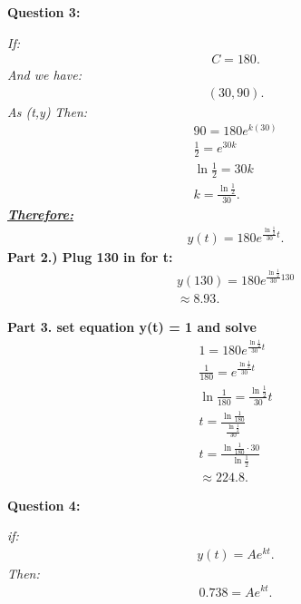 \documentclass{report}
\begin{document}
    \bigbreak \noindent \bigbreak \noindent 
    \begin{Large}
        \textbf{Question 3:}
    \end{Large}
    \bigbreak \noindent 
    \bigbreak \noindent 
    \textit{If:}
    \begin{align*}
        C=180
    .\end{align*}
    \bigbreak \noindent 
    \textit{And we have:}
    \begin{align*}
        (30, 90)
    .\end{align*}
    \bigbreak \noindent 
    \textit{As (t,y)}
    \bigbreak \noindent 
    \textit{Then:}
    \begin{align*}
        90 = 180e^{k(30)} \\ 
        \frac{1}{2} = e^{30k} \\
        \ln{\frac{1}{2}} =30k \\
        k = \frac{\ln{\frac{1}{2}}}{30} 
    .\end{align*}
    \bigbreak \noindent 
    \textbf{\textit{\underline{Therefore:}}}
    \begin{align*}
        y(t) = 180e^{\frac{\ln{\frac{1}{2}}}{30}t}
    .\end{align*}
    \bigbreak \noindent 
    \textbf{Part 2.) Plug 130 in for t:}
    \begin{align*}
        y(130) = 180e^{\frac{\ln{\frac{1}{2}}}{30}130} \\
        \approx 8.93
    .\end{align*}

    \bigbreak \noindent 
    \textbf{Part 3. set equation y(t) = 1 and solve}
    \begin{align*}
        1 = 180e^{\frac{\ln{\frac{1}{2}}}{30}t} \\
        \frac{1}{180} = e^{\frac{\ln{\frac{1}{2}}}{30}t} \\
        \ln{\frac{1}{180}} = \frac{\ln{\frac{1}{2}}}{30}t \\
        t = \frac{\ln{\frac{1}{180}}}{\frac{\ln{\frac{1}{2}}}{30}} \\
        t = \frac{\ln{\frac{1}{180}} \cdot 30}{\ln{\frac{1}{2}}}  \\
        \approx 224.8
    .\end{align*}

    \bigbreak \noindent \bigbreak \noindent 
    \begin{Large}
        \textbf{Question 4:}
    \end{Large}
    \bigbreak \noindent 
    \bigbreak \noindent 
    \textit{if:}
    \begin{align*}
        y(t) = Ae^{kt}
    .\end{align*}
    \bigbreak \noindent 
    \textit{Then:}
    \begin{align*}
        0.738 = Ae^{kt} 
    .\end{align*}
\end{document}
